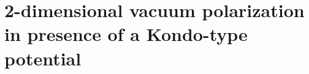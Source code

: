 \chapter{2-dimensional vacuum polarization in presence of a Kondo-type potential}\label{chap-vacuum}

%

%

%


